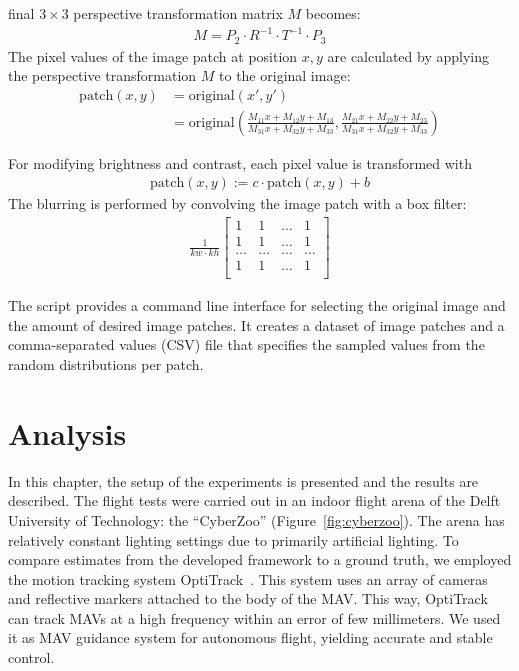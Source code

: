 \documentclass[11pt]{report}
\begin{document}
final $3 \times 3$ perspective transformation matrix $M$ becomes:
\begin{align*}
M =  P_2 \cdot R^{-1} \cdot T^{-1} \cdot P_3
\end{align*}
The pixel values of the image patch at position $x, y$ are calculated
by applying the perspective transformation $M$ to the original image:
\begin{align*}
  \text{patch}(x,y) & = \text{original}(x', y') \\
                    & = \text{original}\left(\frac{M_{11}x + M_{12}y + M_{13}}{M_{31}x + M_{32}y +
  M_{33}}, \frac{M_{21}x + M_{22}y + M_{23}}{M_{31}x + M_{32}y +
  M_{33}}\right)
\end{align*}

For modifying brightness and contrast, each pixel value is transformed
with
\begin{align*}
\text{patch}(x,y) := c \cdot \text{patch}(x,y) + b  
\end{align*}
The blurring is performed by convolving the image patch with a box
filter:
\begin{align*}
  \frac{1}{kw \cdot kh} 
  \begin{bmatrix}
    1 & 1 & \ldots & 1\\
    1 & 1 & \ldots & 1\\
    \ldots & \ldots & \ldots & \ldots\\
    1 & 1 & \ldots & 1\\
  \end{bmatrix}
\end{align*}

The script provides a command line interface for selecting the
original image and the amount of desired image patches. It creates a
dataset of image patches and a comma-separated values (CSV) file that
specifies the sampled values from the random distributions per patch.

\chapter{Analysis}
\label{chap:analysis}
In this chapter, the setup of the experiments is presented and the
results are described. %
The flight tests were carried out in an indoor flight arena of the
Delft University of Technology: the ``CyberZoo''
(Figure~\ref{fig:cyberzoo}). The arena has relatively constant
lighting settings due to primarily artificial lighting. To compare
estimates from the developed framework to a ground truth, we employed
the motion tracking system OptiTrack~\cite{opti}. This system uses an
array of cameras and reflective markers attached to the body of the
MAV. This way, OptiTrack can track MAVs at a high frequency within an
error of few millimeters. We used it as MAV guidance system for
autonomous flight, yielding accurate and stable control.
\end{document}
